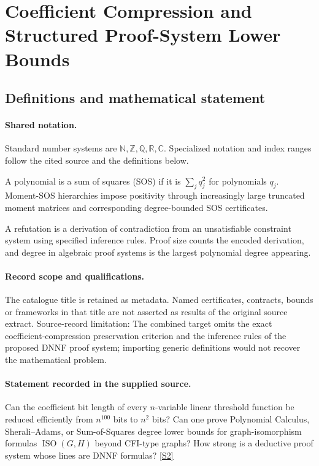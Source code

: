 \documentclass[11pt]{article}
\newcommand{\sref}[2]{\hyperlink{source:#1:#2}{[S#2]}}
\begin{document}
\section{Coefficient Compression and Structured Proof-System Lower Bounds}\label{statement}

\subsection{Definitions and mathematical statement}

\paragraph{Shared notation.}Standard number systems are $\mathbb N,\mathbb Z,\mathbb Q,\mathbb R,\mathbb C$. Specialized notation and index ranges follow the cited source and the definitions below.


A polynomial is a sum of squares (SOS) if it is $\sum_j q_j^2$ for polynomials $q_j$. Moment-SOS hierarchies impose positivity through increasingly large truncated moment matrices and corresponding degree-bounded SOS certificates.

A refutation is a derivation of contradiction from an unsatisfiable constraint system using specified inference rules. Proof size counts the encoded derivation, and degree in algebraic proof systems is the largest polynomial degree appearing.
\paragraph{Record scope and qualifications.}
The catalogue title is retained as metadata. Named certificates, contracts, bounds or frameworks in that title are not asserted as results of the original source extract.
Source-record limitation: The combined target omits the exact coefficient-compression preservation criterion and the inference rules of the proposed DNNF proof system; importing generic definitions would not recover the mathematical problem.
\paragraph{Statement recorded in the supplied source.}
Can the coefficient bit length of every $n$-variable linear threshold function be reduced efficiently from $n^{100}$ bits to $n^2$ bits? Can one prove Polynomial Calculus, Sherali–Adams, or Sum-of-Squares degree lower bounds for graph-isomorphism formulas $\operatorname{ISO}(G,H)$ beyond CFI-type graphs? How strong is a deductive proof system whose lines are DNNF formulas? \sref{statement}{2}
\end{document}
